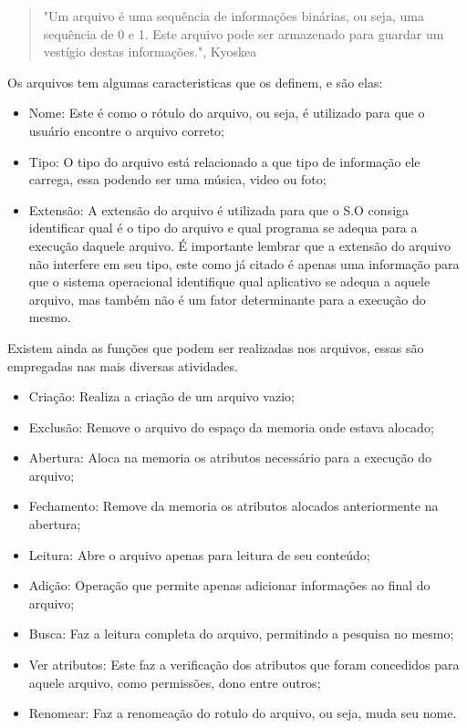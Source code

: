 \documentclass[
	12pt,				%
	openright,			%
	twoside,			%
	a4paper,			%
	chapter=TITLE,		%
	section=TITLE,		%
	english,	
	brazil				%
]{abntex2}
\begin{document}
 \begin{quote}
"Um arquivo é uma sequência de informações binárias, ou seja, uma sequência de 0 e 1. Este arquivo pode ser armazenado para guardar um vestígio destas informações.", Kyoskea
\end{quote}

Os arquivos tem algumas caracteristicas que os definem, e são elas:

\begin{itemize}

\item Nome: Este é como o rótulo do arquivo, ou seja, é utilizado para que o usuário encontre o arquivo correto;
\item Tipo: O tipo do arquivo está relacionado a que tipo de informação ele carrega, essa podendo ser uma música, video ou foto;
\item Extensão: A extensão do arquivo é utilizada para que o S.O consiga identificar qual é o tipo do arquivo e qual programa se adequa para a execução daquele arquivo. É importante lembrar que a extensão do arquivo não interfere em seu tipo, este como já citado é apenas uma informação para que o sistema operacional identifique qual aplicativo se adequa a aquele arquivo, mas também não é um fator determinante para a execução do mesmo.

\end{itemize}

Existem ainda as funções que podem ser realizadas nos arquivos, essas são empregadas nas mais diversas atividades.

\begin{itemize}

\item Criação: Realiza a criação de um arquivo vazio;
\item Exclusão: Remove o arquivo do espaço da memoria onde estava alocado;
\item Abertura: Aloca na memoria os atributos necessário para a execução do arquivo;
\item Fechamento: Remove da memoria os atributos alocados anteriormente na abertura;
\item Leitura: Abre o arquivo apenas para leitura de seu conteúdo;
\item Adição: Operação que permite apenas adicionar informações ao final do arquivo;
\item Busca: Faz a leitura completa do arquivo, permitindo a pesquisa no mesmo;
\item Ver atributos: Este faz a verificação dos atributos que foram concedidos para aquele arquivo, como permissões, dono entre outros;
\item Renomear: Faz a renomeação do rotulo do arquivo, ou seja, muda seu nome.

\end{itemize}
\end{document}
